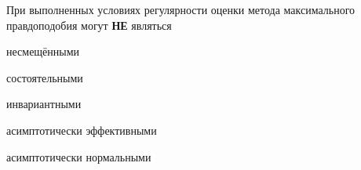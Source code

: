 
\begin{question}
При выполненных условиях регулярности оценки метода максимального
правдоподобия могут \textbf{НЕ} являться
\begin{answerlist}
  \item несмещёнными
  \item состоятельными
  \item инвариантными
  \item асимптотически эффективными
  \item асимптотически нормальными
\end{answerlist}
\end{question}



